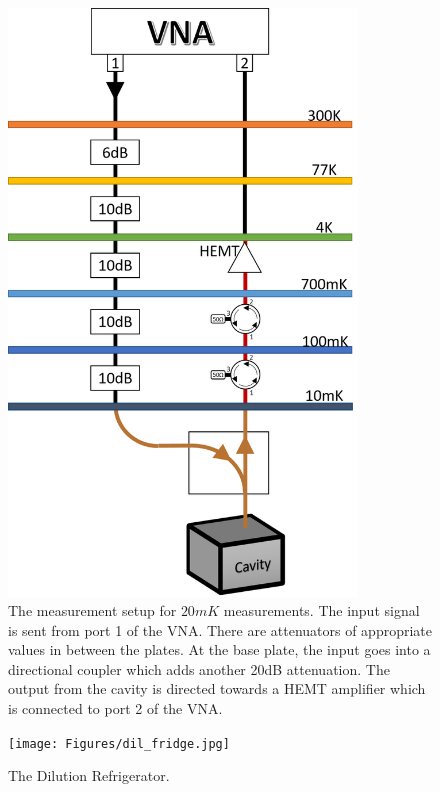 \begin{figure}
\centering
\includegraphics[width=350px]{Figures/circuit.png}
\decoRule
\caption[External Circuit]{The measurement setup for $20mK$ measurements. The input signal is sent from port 1 of the VNA. There are attenuators of appropriate values in between the plates. At the base plate, the input goes into a directional coupler which adds another 20dB attenuation. The output from the cavity is directed towards a HEMT amplifier which is connected to port 2 of the VNA.}
\label{fig:circuit with fridge}
\end{figure}

\begin{figure}
\centering
\texttt{[image: Figures/dil\_fridge.jpg]}
\decoRule
\caption[Dilution Refrigerator]{The Dilution Refrigerator.}
\label{fig:circuit with fridge}
\end{figure}

